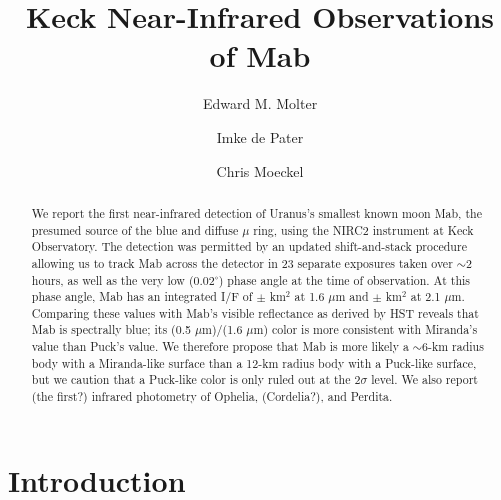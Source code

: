 \documentclass[preprint]{aastex631}
\begin{document}
	
\newcommand{\ergsec}{erg s$^{-1}$ cm$^{-2}$ $\mu$m$^{-1}$}

\title{Keck Near-Infrared Observations of Mab}

\author[0000-0003-3799-9033]{Edward M. Molter}

\author{Imke de Pater}

\author{Chris Moeckel}


\begin{abstract}
We report the first near-infrared detection of Uranus's smallest known moon Mab, the presumed source of the blue and diffuse $\mu$ ring, using the NIRC2 instrument at Keck Observatory. The detection was permitted by an updated shift-and-stack procedure allowing us to track Mab across the detector in 23 separate exposures taken over $\sim$2 hours, as well as the very low (0.02$^\circ$) phase angle at the time of observation.
At this phase angle, Mab has an integrated I/F of 
 $\pm$  km$^{2}$ 
at 1.6 $\mu$m and 
 $\pm$  km$^{2}$ 
at 2.1 $\mu$m. 
Comparing these values with Mab's visible reflectance as derived by HST reveals that Mab is spectrally blue; its (0.5 $\mu$m)/(1.6 $\mu$m) color is more consistent with Miranda's value than Puck's value. We therefore propose that Mab is more likely a $\sim$6-km radius body with a Miranda-like surface than a 12-km radius body with a Puck-like surface, but we caution that a Puck-like color is only ruled out at the 2$\sigma$ level.
We also report (the first?) infrared photometry of Ophelia, (Cordelia?), and Perdita.
\end{abstract}

\keywords{}

\section{Introduction}
\label{s:intro}
\end{document}
